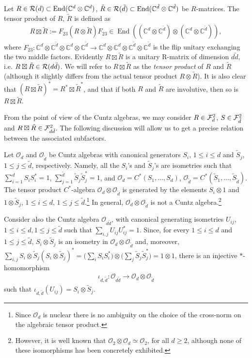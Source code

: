 \documentclass[12pt,a4paper]{amsart}
\numberwithin{equation}{section}
\theoremstyle{remark}
\def\End{\operatorname{End}}
\newcommand{\ot}{\otimes}
\newcommand{\Cl}{\mathbb{C}}
\newcommand{\CO}[0]{\mathcal{O}} \newcommand{\CP}[0]{\mathcal{P}}
\begin{document}
Let $R \in \CR(d)\subset\End(\Cl^d\ot\Cl^d)$, $\tilde R \in \CR(\tilde d)\subset\End(\Cl^{\tilde d}\ot\Cl^{\tilde d})$ be $R$-matrices. The tensor product of $R$, $\tilde R$ is defined as
\begin{align}
	R \boxtimes \tilde R 
	:= F_{23} (R \otimes \tilde R) F_{23} \in \End((\Cl^d\ot\Cl^{\tilde d})\ot(\Cl^d\ot\Cl^{\tilde d})),
\end{align}
where $F_{23}: \Cl^d\ot\Cl^{\tilde d}\ot\Cl^d\ot\Cl^{\tilde d}\to\Cl^d\ot\Cl^{d}\ot\Cl^{\tilde d}\ot\Cl^{\tilde d}$ is the flip unitary exchanging the two middle factors. Evidently $R\boxtimes\tilde R$ is a unitary R-matrix of dimension $d\tilde d$, i.e. $R\boxtimes\tilde R\in\mathcal{R}(d\tilde d)$. We will refer to $R \boxtimes \tilde R$ as the {\it tensor product} of $R$ and $\tilde R$ (although it slightly differs from the actual tensor product $R\ot\tilde R$). It is also clear that $(R \boxtimes \tilde R)^* = R^* \boxtimes \tilde R^*$, and that if both $R$ and $\tilde R$ are involutive, then so is $R \boxtimes \tilde R$. 

From the point of view of the Cuntz algebras, we may consider $R \in \mathcal{F}_d^2$, $S \in \mathcal{F}_{\tilde d}^2$ and $R \boxtimes \tilde R \in \mathcal{F}_{d\tilde d}^2$. The following discussion will allow us to get a precise relation between the associated subfactors.

\medskip

Let $\CO_d$ and $\CO_{\tilde d}$ be Cuntz algebras with canonical generators $S_i$, $1 \leq i \leq d$ and $\tilde S_j$, $1 \leq j \leq \tilde d$, respectively.
Namely, all the $S_i$'s and $\tilde S_j$'s are isometries such that $\sum_{i=1}^d S_i S_i^* = 1$, $\sum_{j=1}^{\tilde d} \tilde S_j \tilde S_j^* = 1$, and $\CO_d=C^*(S_1,\ldots,S_d)$, $\CO_{\tilde d} = C^*(\tilde S_1,\ldots, \tilde S_{\tilde d})$.
The tensor product $C^*$-algebra $\CO_d \otimes \CO_{\tilde d}$ is generated by the elements $S_i \otimes 1$ and $1 \otimes \tilde S_j$, $1 \leq i \leq d$, $1 \leq j \leq \tilde d$.\footnote{Since $\CO_d$ is nuclear there is no ambiguity on the choice of the cross-norm on the algebraic tensor product.}
In general, $\CO_d \otimes \CO_{\tilde d}$ is not a Cuntz algebra.\footnote{However, it is well known that $\CO_2 \otimes \CO_d \simeq \CO_2$, for all $d \geq 2$, 
although none of these isomorphisms has been concretely exhibited.}

Consider also the Cuntz algebra $\CO_{d\tilde d}$, with canonical generating isometries $U_{ij}$, $1 \leq i \leq d, 1 \leq j \leq \tilde d$ such that $\sum_{i,j} U_{ij} U_{ij}^* = 1$.
Since, for every $1 \leq i \leq d$ and $1 \leq j \leq \tilde d$, $S_i \otimes \tilde S_j$ is an isometry in $\CO_d \otimes \CO_{\tilde d}$ and, moreover, 
$\sum_{i,j} S_i \otimes \tilde S_j (S_i \otimes \tilde S_j)^* = \big(\sum_i S_i S_i^*\big) \otimes \big(\sum_j \tilde S_j \tilde S_j^* \big) = 1 \otimes 1$,
there is an injective $*$-homomorphism 
\begin{align}
	\iota_{d,\tilde d} : \CO_{d\tilde d} \to \CO_d \otimes \CO_{\tilde d}
\end{align}
such that $\iota_{d,\tilde d}(U_{ij})=S_i \otimes \tilde S_j$.
\end{document}
